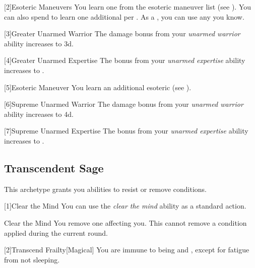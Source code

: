         [2]{Esoteric Maneuvers} 
        You learn one  from the esoteric maneuver list (see ).
        You can also spend  to learn one additional  per .
        As a , you can use any  you know.




        [3]{Greater Unarmed Warrior} The damage bonus from your \textit{unarmed warrior} ability increases to \plus3d.

        [4]{Greater Unarmed Expertise}
        The bonus from your \textit{unarmed expertise} ability increases to .

        [5]{Esoteric Maneuver} You learn an additional esoteric  (see ).

        [6]{Supreme Unarmed Warrior} The damage bonus from your \textit{unarmed warrior} ability increases to \plus4d.

        [7]{Supreme Unarmed Expertise} The bonus from your \textit{unarmed expertise} ability increases to .

    \subsection{Transcendent Sage}
        This archetype grants you abilities to resist or remove conditions.

        [1]{Clear the Mind} You can use the \textit{clear the mind} ability as a standard action.
        \begin{freeability}{Clear the Mind}
            You remove one  affecting you.
            This cannot remove a condition applied during the current round.
        \end{freeability}

        [2]{Transcend Frailty}[Magical]
        You are immune to being  and , except for fatigue from not sleeping.

